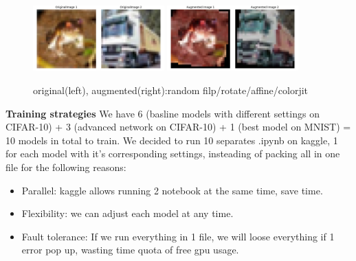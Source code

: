 \documentclass{article}
\begin{document}
\begin{figure}[htbp]
  \centering
  \includegraphics[width=0.45\textwidth]{fig/original.png} %
  \includegraphics[width=0.45\textwidth]{fig/augmented.png} %
  \caption{original(left), augmented(right):random filp/rotate/affine/colorjit } %
  \label{fig:original} %
\end{figure}

\noindent\textbf{Training strategies}
We have 6 (basline models with different settings on CIFAR-10) + 3 (advanced network on CIFAR-10) + 1 (best model on MNIST) = 10 models in total to train. We decided to run 10 separates .ipynb on kaggle, 1 for each model with it's corresponding settings, insteading of packing all in one file for the following reasons:

\begin{itemize}
  \item Parallel: kaggle allows running 2 notebook at the same time, save time.
  \item Flexibility: we can adjust each model at any time.
  \item Fault tolerance: If we run everything in 1 file, we will loose everything if 1 error pop up, wasting time quota of free gpu usage.
\end{itemize}
\end{document}
